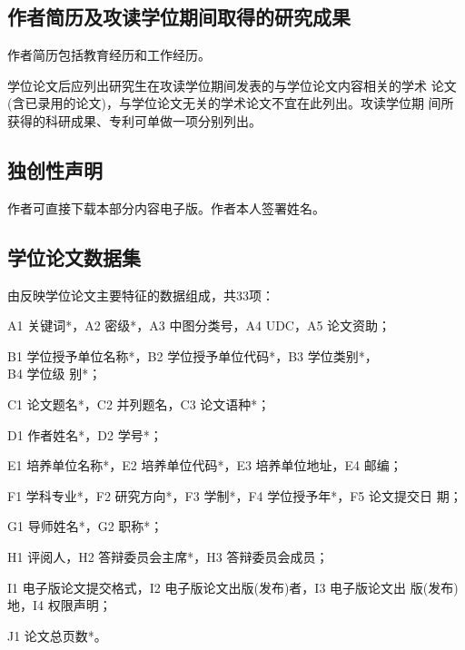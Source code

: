 \subsection{作者简历及攻读学位期间取得的研究成果}
作者简历包括教育经历和工作经历。 

学位论文后应列出研究生在攻读学位期间发表的与学位论文内容相关的学术
论文(含已录用的论文)，与学位论文无关的学术论文不宜在此列出。攻读学位期
间所获得的科研成果、专利可单做一项分别列出。

\subsection{独创性声明 }
作者可直接下载本部分内容电子版。作者本人签署姓名。

\subsection{学位论文数据集 }
由反映学位论文主要特征的数据组成，共33项： 

A1 关键词*，A2 密级*，A3 中图分类号，A4 UDC，A5 论文资助；

B1 学位授予单位名称*，B2 学位授予单位代码*，B3 学位类别*，\\B4 学位级
别*；

C1 论文题名*，C2 并列题名，C3 论文语种*；

D1 作者姓名*，D2 学号*；

E1 培养单位名称*，E2 培养单位代码*，E3 培养单位地址，E4 邮编；

F1 学科专业*，F2 研究方向*，F3 学制*，F4 学位授予年*，F5 论文提交日
期\*；

G1 导师姓名*，G2 职称*；

H1 评阅人，H2 答辩委员会主席*，H3 答辩委员会成员；

I1 电子版论文提交格式，I2 电子版论文出版(发布)者，I3 电子版论文出
版(发布)地，I4 权限声明；

J1 论文总页数*。